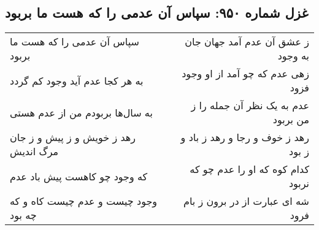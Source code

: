 \begin{center}
\section*{غزل شماره ۹۵۰: سپاس آن عدمی را که هست ما بربود}
\label{sec:0950}
\begin{longtable}{l p{0.5cm} r}
سپاس آن عدمی را که هست ما بربود
&&
ز عشق آن عدم آمد جهان جان به وجود
\\
به هر کجا عدم آید وجود کم گردد
&&
زهی عدم که چو آمد از او وجود فزود
\\
به سال‌ها بربودم من از عدم هستی
&&
عدم به یک نظر آن جمله را ز من بربود
\\
رهد ز خویش و ز پیش و ز جان مرگ اندیش
&&
رهد ز خوف و رجا و رهد ز باد و ز بود
\\
که وجود چو کاهست پیش باد عدم
&&
کدام کوه که او را عدم چو که نربود
\\
وجود چیست و عدم چیست کاه و که چه بود
&&
شه ای عبارت از در برون ز بام فرود
\\
\end{longtable}
\end{center}
